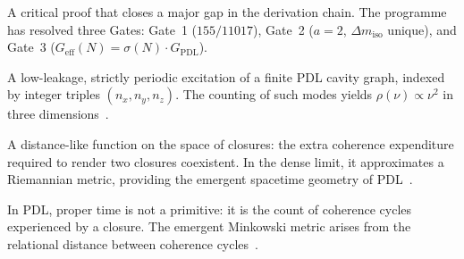 \documentclass[11pt,a4paper]{article}
\theoremstyle{plain}
\theoremstyle{definition}
\theoremstyle{remark}
\newcommand{\Geff}{G_{\mathrm{eff}}}
\newcommand{\GPDL}{G_{\mathrm{PDL}}}
\newcommand{\sigmaN}{\sigma(N)}
\begin{document}
\begin{description}[style=nextline, leftmargin=2.5cm]
\item[Gate]
A critical proof that closes a major gap in the derivation chain.
The programme has resolved three Gates: Gate~1 ($155/11017$), Gate~2 ($a=2$, $\Delta m_{\mathrm{iso}}$ unique), and Gate~3 ($\Geff(N)=\sigmaN\cdot\GPDL$).

\item[Cavity mode]
A low-leakage, strictly periodic excitation of a finite PDL cavity graph, indexed by integer triples $(n_x,n_y,n_z)$.
The counting of such modes yields $\rho(\nu)\propto\nu^2$ in three dimensions~\citep{D18}.

\item[Coherence-cost pseudo-metric]
A distance-like function on the space of closures: the extra coherence expenditure required to render two closures coexistent.
In the dense limit, it approximates a Riemannian metric, providing the emergent spacetime geometry of PDL~\citep{D08}.

\item[Proper time]
In PDL, proper time is not a primitive: it is the count of coherence cycles experienced by a closure.
The emergent Minkowski metric arises from the relational distance between coherence cycles~\citep{D10a}.

\end{description}

\clearpage


\end{document}
